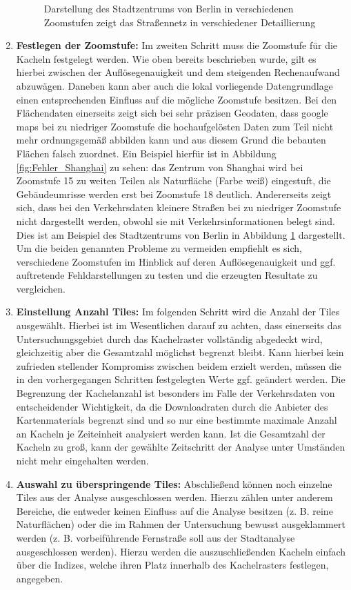 \begin{enumerate}
\begin{figure}
    \caption{Darstellung des Stadtzentrums von Berlin in verschiedenen Zoomstufen zeigt das Straßennetz in verschiedener Detaillierung}
    \label{fig:Fehler_Berlin}
\end{figure}
%
\item \textbf{Festlegen der Zoomstufe:} Im zweiten Schritt muss die Zoomstufe für die Kacheln festgelegt werden. Wie oben bereits beschrieben wurde, gilt es hierbei zwischen der Auflösegenauigkeit und dem steigenden Rechenaufwand abzuwägen. Daneben kann aber auch die lokal vorliegende Datengrundlage einen entsprechenden Einfluss auf die mögliche Zoomstufe besitzen. Bei den Flächendaten einerseits zeigt sich bei sehr präzisen Geodaten, dass google maps bei zu niedriger Zoomstufe die hochaufgelösten Daten zum Teil nicht mehr ordnungsgemäß abbilden kann und aus diesem Grund die bebauten Flächen falsch zuordnet. Ein Beispiel hierfür ist in Abbildung \ref{fig:Fehler_Shanghai} zu sehen: das Zentrum von Shanghai wird bei Zoomstufe 15 zu weiten Teilen als Naturfläche (Farbe weiß) eingestuft, die Gebäudeumrisse werden erst bei Zoomstufe 18 deutlich. Andererseits zeigt sich, dass bei den Verkehrsdaten kleinere Straßen bei zu niedriger Zoomstufe nicht dargestellt werden, obwohl sie mit Verkehrsinformationen belegt sind. Dies ist am Beispiel des Stadtzentrums von Berlin in Abbildung \ref{fig:Fehler_Berlin} dargestellt. Um die beiden genannten Probleme zu vermeiden empfiehlt es sich, verschiedene Zoomstufen im Hinblick auf deren Auflösegenauigkeit und ggf. auftretende Fehldarstellungen zu testen und die erzeugten Resultate zu vergleichen.
%
\item \textbf{Einstellung Anzahl Tiles:} Im folgenden Schritt wird die Anzahl der Tiles ausgewählt. Hierbei ist im Wesentlichen darauf zu achten, dass einerseits das Untersuchungsgebiet durch das Kachelraster vollständig abgedeckt wird, gleichzeitig aber die Gesamtzahl möglichst begrenzt bleibt. Kann hierbei kein zufrieden stellender Kompromiss zwischen beidem erzielt werden, müssen die in den vorhergegangen Schritten festgelegten Werte ggf. geändert werden. Die Begrenzung der Kachelanzahl ist besonders im Falle der Verkehrsdaten von entscheidender Wichtigkeit, da die Downloadraten durch die Anbieter des Kartenmaterials begrenzt sind und so nur eine bestimmte maximale Anzahl an Kacheln je Zeiteinheit analysiert werden kann. Ist die Gesamtzahl der Kacheln zu groß, kann der gewählte Zeitschritt der Analyse unter Umständen nicht mehr eingehalten werden.  
%
\item \textbf{Auswahl zu überspringende Tiles:} Abschließend können noch einzelne Tiles aus der Analyse ausgeschlossen werden. Hierzu zählen unter anderem Bereiche, die entweder keinen Einfluss auf die Analyse besitzen (z. B. reine Naturflächen) oder die im Rahmen der Untersuchung bewusst ausgeklammert werden (z. B. vorbeiführende Fernstraße soll aus der Stadtanalyse ausgeschlossen werden). Hierzu werden die auszuschließenden Kacheln einfach über die Indizes, welche ihren Platz innerhalb des Kachelrasters festlegen, angegeben.
\end{enumerate}



